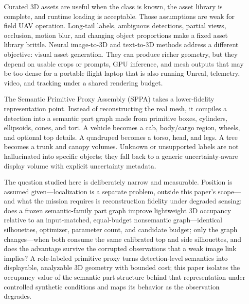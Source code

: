 \documentclass[11pt,a4paper]{article}
\begin{document}
Curated 3D assets are useful when the class is known, the asset library is
complete, and runtime loading is acceptable. Those assumptions are weak for
field UAV operation. Long-tail labels, ambiguous detections, partial views,
occlusion, motion blur, and changing object proportions make a fixed asset
library brittle. Neural image-to-3D and text-to-3D methods address a different
objective: visual asset generation. They can produce richer geometry, but they
depend on usable crops or prompts, GPU inference, and mesh outputs that may be
too dense for a portable flight laptop that is also running Unreal, telemetry,
video, and tracking under a shared rendering budget.

The Semantic Primitive Proxy Assembly (SPPA) takes a lower-fidelity
representation point. Instead of reconstructing
the real mesh, it compiles a detection into a semantic part graph made from
primitive boxes, cylinders, ellipsoids, cones, and tori. A vehicle becomes a
cab, body/cargo region, wheels, and optional top details. A quadruped becomes a
torso, head, and legs. A tree becomes a trunk and canopy volumes. Unknown or
unsupported labels are not hallucinated into specific objects; they fall back to
a generic uncertainty-aware display volume with explicit uncertainty metadata.

The question studied here is deliberately narrow and measurable. Position is
assumed given---localization is a separate problem, outside this paper's
scope---and what the mission requires is reconstruction fidelity under
degraded sensing: does a frozen semantic-family part graph improve lightweight
3D occupancy relative to an input-matched, equal-budget nonsemantic
graph---identical silhouettes, optimizer, parameter count, and candidate
budget; only the graph changes---when both consume
the same calibrated top and side silhouettes, and does the advantage survive
the corrupted observations that a weak image link implies? A role-labeled
primitive proxy turns detection-level semantics into displayable, analyzable
3D geometry with bounded cost; this paper isolates the occupancy value of the
semantic part structure behind that representation under controlled synthetic
conditions and maps its behavior as the observation degrades.
\end{document}
